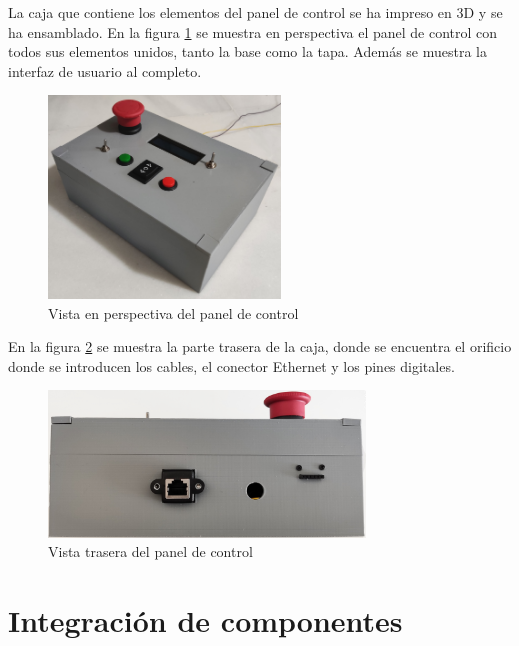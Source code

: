 La caja que contiene los elementos del panel de control se ha impreso en 3D y se ha ensamblado. En la figura \ref{fig:cajaexterior} se muestra en perspectiva el panel de control con todos sus elementos unidos, tanto la base como la tapa. Además se muestra la interfaz de usuario al completo.

\begin{figure}[hbtp]%
    \centering 
        \includegraphics[width=0.55\textwidth]{07-resultados/cajaexterior.jpg}
    \caption{Vista en perspectiva del panel de control}
    \label{fig:cajaexterior} 
\end{figure}

En la figura \ref{fig:cajatrasero} se muestra la parte trasera de la caja, donde se encuentra
el orificio donde se introducen los cables, el conector Ethernet y los pines digitales.

\begin{figure}[hbtp]%
    \centering 
        \includegraphics[width=0.75\textwidth]{07-resultados/cajatrasero.jpg}
    \caption{Vista trasera del panel de control}
    \label{fig:cajatrasero} 
\end{figure}



\section{Integración de componentes}

